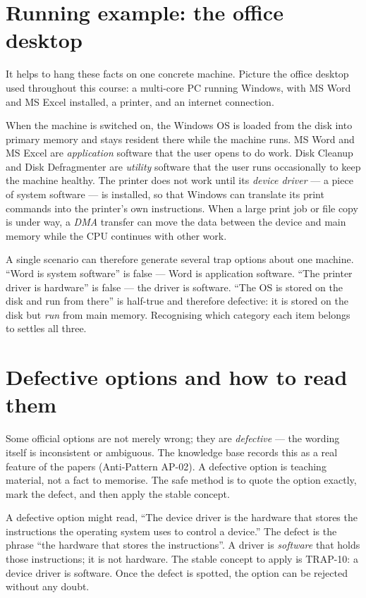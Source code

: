 \section{Running example: the office desktop}
It helps to hang these facts on one concrete machine. Picture the office
desktop used throughout this course: a multi-core PC running Windows, with
MS Word and MS Excel installed, a printer, and an internet connection.

When the machine is switched on, the Windows OS is loaded from the disk into
primary memory and stays resident there while the machine runs. MS Word and
MS Excel are \emph{application} software that the user opens to do work.
Disk Cleanup and Disk Defragmenter are \emph{utility} software that the user
runs occasionally to keep the machine healthy. The printer does not work
until its \emph{device driver} --- a piece of system software --- is
installed, so that Windows can translate its print commands into the
printer's own instructions. When a large print job or file copy is under way,
a \emph{DMA} transfer can move the data between the device and main memory
while the CPU continues with other work.

\begin{example}
A single scenario can therefore generate several trap options about one
machine. ``Word is system software'' is false --- Word is application
software. ``The printer driver is hardware'' is false --- the driver is
software. ``The OS is stored on the disk and run from there'' is half-true
and therefore defective: it is stored on the disk but \emph{run} from main
memory. Recognising which category each item belongs to settles all three.
\end{example}

\section{Defective options and how to read them}
Some official options are not merely wrong; they are \emph{defective} --- the
wording itself is inconsistent or ambiguous. The knowledge base records this
as a real feature of the papers (Anti-Pattern AP-02). A defective option is
teaching material, not a fact to memorise. The safe method is to quote the
option exactly, mark the defect, and then apply the stable concept.

\begin{example}
A defective option might read, ``The device driver is the hardware that
stores the instructions the operating system uses to control a device.'' The
defect is the phrase ``the hardware that stores the instructions''. A driver
is \emph{software} that holds those instructions; it is not hardware. The
stable concept to apply is TRAP-10: a device driver is software. Once the
defect is spotted, the option can be rejected without any doubt.
\end{example}

